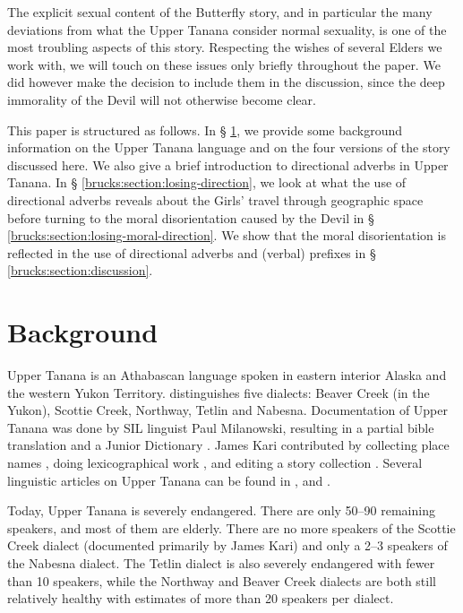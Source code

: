 The explicit sexual content of the Butterfly story, and in particular the many deviations from what the Upper Tanana consider normal sexuality, is one of the most troubling aspects of this story. Respecting the wishes of several Elders we work with, we will touch on these issues only briefly throughout the paper. We did however make the decision to include them in the discussion, since the deep immorality of the Devil will not otherwise become clear.

This paper is structured as follows. In § \ref{brucks:section:background}, we provide some background information on the Upper Tanana language and on the four versions of the story discussed here. We also give a brief introduction to directional adverbs in Upper Tanana. In § \ref{brucks:section:losing-direction}, we look at what the use of directional adverbs reveals about the Girls' travel through geographic space before turning to the moral disorientation caused by the Devil in § \ref{brucks:section:losing-moral-direction}. We show that the moral disorientation is reflected in the use of directional adverbs and (verbal) prefixes in § \ref{brucks:section:discussion}.

\section{Background}
\label{brucks:section:background}

Upper Tanana is an Athabascan language spoken in eastern interior Alaska and the western Yukon Territory. \citet{MinouraN1994} distinguishes five dialects: Beaver Creek (in the Yukon), Scottie Creek, Northway, Tetlin and Nabesna. Documentation of Upper Tanana was done by SIL linguist Paul Milanowski, resulting in a partial bible translation \citep{MilanowskiPJohnA1966, MilanowskiPJohnA1972} and a Junior Dictionary \citep{MilanowskiPJimersonS1975, MilanowskiPJohnA1979}. James Kari contributed by collecting place names \citep{KariJ1997UTmap}, doing lexicographical work \citep{KariJ1997stem}, and editing a story collection \citep{TyoneM1996}. Several linguistic articles on Upper Tanana can be found in \citet{MinouraN1994, MinouraN1997, TuttleSLovickONunez-OrtizI2011}, and \citet{LovickO2012a-metaphor, LovickO2012b-genre}.

Today, Upper Tanana is severely endangered. There are only 50–90 remaining speakers, and most of them are elderly. There are no more speakers of the Scottie Creek dialect (documented primarily by James Kari) and only a 2–3 speakers of the Nabesna dialect. The Tetlin dialect is also severely endangered with fewer than 10 speakers, while the Northway and Beaver Creek dialects are both still relatively healthy with estimates of more than 20 speakers per dialect.

